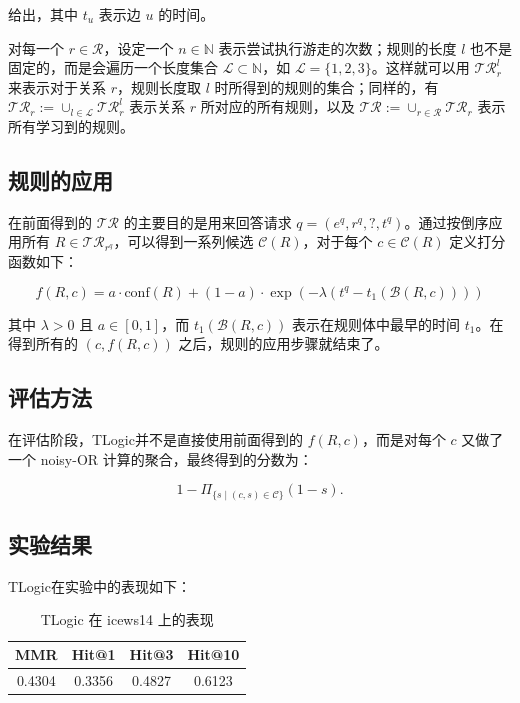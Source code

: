 \documentclass[a4paper, AutoFakeBold]{article}
\begin{document}
给出，其中 $t_u$ 表示边 $u$ 的时间。

对每一个 $r\in{\mathcal R}$，设定一个 $n\in{\mathbb N}$ 表示尝试执行游走的次数；规则的长度 $l$ 也不是固定的，而是会遍历一个长度集合 ${\mathcal L}\subset{\mathbb N}$，如 ${\mathcal L}=\{1,2,3\}$。这样就可以用 ${\mathcal {TR}}_r^l$ 来表示对于关系 $r$，规则长度取 $l$ 时所得到的规则的集合；同样的，有 $\mathcal{TR}_r := \cup_{l \in \mathcal{L}} \mathcal{TR}_r^l$ 表示关系 $r$ 所对应的所有规则，以及 $\mathcal{TR} := \cup_{r \in \mathcal{R}} \mathcal{TR}_r$ 表示所有学习到的规则。

\subsection{规则的应用}

在前面得到的 $\mathcal{TR}$ 的主要目的是用来回答请求 $q = (e^q, r^q, ?, t^q)$。通过按倒序应用所有 $R\in\mathcal{TR}_{r^q}$，可以得到一系列候选 $\mathcal{C}(R)$，对于每个 $c \in \mathcal{C}(R)$ 定义打分函数如下：


\begin{equation}
	f(R,c) = a \cdot \mathrm{conf}(R) + (1-a) \cdot \exp(-\lambda (t^q - t_1(\mathcal{B}(R,c))))
\end{equation}


其中 $\lambda>0$ 且 $a\in[0,1]$，而 $t_1(\mathcal{B}(R,c))$ 表示在规则体中最早的时间 $t_1$。在得到所有的 $(c, f(R,c))$ 之后，规则的应用步骤就结束了。

\subsection{评估方法}

在评估阶段，TLogic并不是直接使用前面得到的 $f(R,c)$，而是对每个 $c$ 又做了一个 noisy-OR 计算的聚合，最终得到的分数为：


\begin{equation}
	1 - \Pi_{\{s \mid (c, s) \in \mathcal{C}\}} (1 - s).
\end{equation}


\subsection{实验结果}

TLogic在实验中的表现如下：


\begin{table}[htbp]
	\centering
	\caption{TLogic 在 icews14 上的表现}
	\begin{tabular}{cccc}
		\toprule  %
		MMR&Hit@1&Hit@3&Hit@10 \\ 
		\midrule  %
		0.4304&0.3356&0.4827&0.6123 \\
		\bottomrule  %
	\end{tabular}
\end{table}
\end{document}
